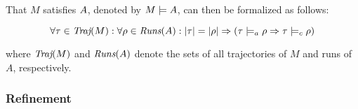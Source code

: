 That $M$ satisfies $A$, denoted by $M \models A$, can then be formalized as follows: %

\begin{equation*}
\forall \tau \in \operatorname{\textit{Traj}}(M) : \forall \rho \in \operatorname{\textit{Runs}}(A) : | \tau | = | \rho | \Rightarrow (\tau \models_{a} \rho \Rightarrow \tau \models_{c} \rho)
\end{equation*}

\noindent where $\operatorname{\textit{Traj}}(M)$ and $\operatorname{\textit{Runs}}(A)$ denote the sets of all trajectories of $M$ and runs of $A$, respectively.







\subsubsection{Refinement}

